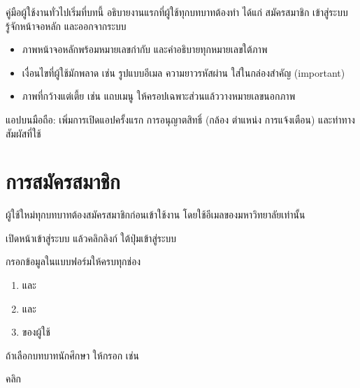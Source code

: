 %
\label{ch:start}

\begin{guide}
คู่มือผู้ใช้งานทั่วไปเริ่มที่บทนี้ อธิบายงานแรกที่ผู้ใช้ทุกบทบาทต้องทำ ได้แก่ สมัครสมาชิก เข้าสู่ระบบ
รู้จักหน้าจอหลัก และออกจากระบบ
\begin{itemize}
  \item ภาพหน้าจอหลักพร้อมหมายเลขกำกับ และคำอธิบายทุกหมายเลขใต้ภาพ
  \item เงื่อนไขที่ผู้ใช้มักพลาด เช่น รูปแบบอีเมล ความยาวรหัสผ่าน ใส่ในกล่องสำคัญ (important)
  \item ภาพที่กว้างแต่เตี้ย เช่น แถบเมนู ให้ครอปเฉพาะส่วนแล้ววางหมายเลขนอกภาพ
\end{itemize}
แอปบนมือถือ: เพิ่มการเปิดแอปครั้งแรก การอนุญาตสิทธิ์ (กล้อง ตำแหน่ง การแจ้งเตือน) และท่าทางสัมผัสที่ใช้
\end{guide}

\section{การสมัครสมาชิก}
\label{sec:register}

ผู้ใช้ใหม่ทุกบทบาทต้องสมัครสมาชิกก่อนเข้าใช้งาน โดยใช้อีเมลของมหาวิทยาลัยเท่านั้น

\begin{steps}
  \item เปิดหน้าเข้าสู่ระบบ แล้วคลิกลิงก์  ใต้ปุ่มเข้าสู่ระบบ
  \item กรอกข้อมูลในแบบฟอร์มให้ครบทุกช่อง
        \begin{enumerate}
          \item {} และ 
          \item {} และ 
          \item {} ของผู้ใช้
        \end{enumerate}
  \item ถ้าเลือกบทบาทนักศึกษา ให้กรอก  เช่น 
  \item คลิก 
\end{steps}

